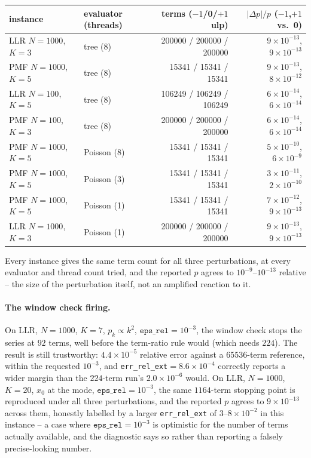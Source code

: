 \documentclass[11pt]{article}
\begin{document}
\begin{center}
\small
\begin{tabular}{llrr}
\toprule
instance & evaluator (threads) & terms ($-1$/0/$+1$ ulp) & $|\Delta p|/p$ ($-1$,$+1$ vs.\ 0) \\
\midrule
LLR $N=1000$, $K=3$ & tree (8)    & 200000 / 200000 / 200000 & $9\times10^{-13}$, $9\times10^{-13}$ \\
PMF $N=1000$, $K=5$ & tree (8)    & 15341 / 15341 / 15341    & $9\times10^{-13}$, $8\times10^{-12}$ \\
LLR $N=100$, $K=5$  & tree (8)    & 106249 / 106249 / 106249 & $6\times10^{-14}$, $6\times10^{-14}$ \\
PMF $N=100$, $K=3$  & tree (8)    & 200000 / 200000 / 200000 & $6\times10^{-14}$, $6\times10^{-14}$ \\
PMF $N=1000$, $K=5$ & Poisson (8) & 15341 / 15341 / 15341    & $5\times10^{-10}$, $6\times10^{-9}$ \\
PMF $N=1000$, $K=5$ & Poisson (3) & 15341 / 15341 / 15341    & $3\times10^{-11}$, $2\times10^{-10}$ \\
PMF $N=1000$, $K=5$ & Poisson (1) & 15341 / 15341 / 15341    & $7\times10^{-12}$, $9\times10^{-13}$ \\
LLR $N=1000$, $K=3$ & Poisson (1) & 200000 / 200000 / 200000 & $9\times10^{-13}$, $9\times10^{-13}$ \\
\bottomrule
\end{tabular}
\end{center}

Every instance gives the same term count for all three perturbations, at every evaluator and thread
count tried, and the reported $p$ agrees to $10^{-9}$--$10^{-13}$ relative -- the size of the
perturbation itself, not an amplified reaction to it.

\paragraph{The window check firing.} On LLR, $N=1000$, $K=7$, $p_k\propto k^2$,
$\texttt{eps\_rel}=10^{-3}$, the window check stops the series at $92$ terms, well before the
term-ratio rule would (which needs $224$). The result is still trustworthy: $4.4\times10^{-5}$
relative error against a $65536$-term reference, within the requested $10^{-3}$, and
\texttt{err\_rel\_ext}$=8.6\times10^{-4}$ correctly reports a wider margin than the $224$-term run's
$2.0\times10^{-6}$ would. On LLR, $N=1000$, $K=20$, $x_0$ at the mode, $\texttt{eps\_rel}=10^{-3}$,
the same $1164$-term stopping point is reproduced under all three perturbations, and the reported
$p$ agrees to $9\times10^{-13}$ across them, honestly labelled by a larger
\texttt{err\_rel\_ext} of $3$--$8\times10^{-2}$ in this instance -- a case where
$\texttt{eps\_rel}=10^{-3}$ is optimistic for the number of terms actually available, and the
diagnostic says so rather than reporting a falsely precise-looking number.
\end{document}
